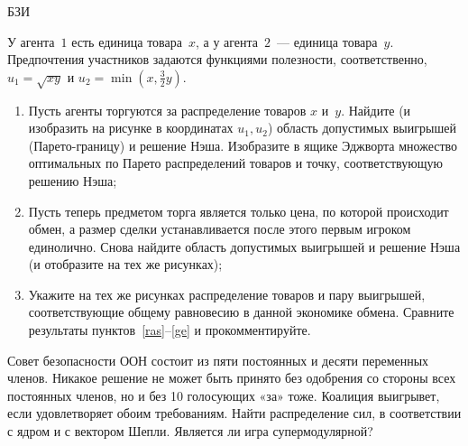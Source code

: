\begin{problem}
\begin{source}
БЗИ
\end{source}
 У агента~$1$ есть единица
товара~$x$, а у агента~$2$~— единица товара~$y$.
Предпочтения участников задаются функциями полезности,
соответственно, $u_1=\sqrt{xy}$ и
$u_2=\min\left(x,\frac{3}{2}y\right)$.

\begin{enumerate}

\item\label{ras} Пусть агенты торгуются за распределение
товаров $x$ и~$y$. Найдите (и изобразить на рисунке в
координатах $u_1,u_2$) область допустимых выигрышей
(Парето-границу) и решение Нэша. Изобразите в ящике
Эджворта множество оптимальных по Парето распределений
товаров и точку, соответствующую решению Нэша;

\item\label{p} Пусть теперь предметом торга является только
цена, по которой происходит обмен, а размер сделки
устанавливается после этого первым игроком единолично.
Снова найдите область допустимых выигрышей и решение Нэша
(и отобразите на тех же рисунках);

\item\label{ge} Укажите на тех же рисунках распределение
товаров и пару выигрышей, соответствующие общему равновесию
в данной экономике обмена. Сравните результаты
пунктов~\ref{ras}--\ref{ge} и прокомментируйте.

\end{enumerate}


\begin{sol}

\end{sol}
\end{problem}

\begin{problem}
\begin{source}
\cite{savva:nmu}
\end{source}
Совет безопасности ООН состоит из пяти постоянных и десяти переменных членов. Никакое решение не может быть принято без одобрения со стороны всех постоянных членов, но и без 10 голосующих «за» тоже. Коалиция выигрывет, если удовлетворяет обоим требованиям. Найти распределение сил, в соответствии с ядром и с вектором Шепли. Является ли игра супермодулярной?


\begin{sol}

\end{sol}
\end{problem}



